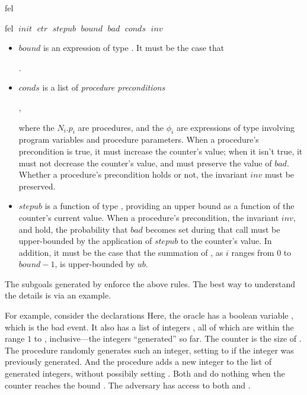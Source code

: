 \begin{tactic}{fel}
\begin{tsyntax}{fel $\;\mathit{init}$ $\;\mathit{ctr}$ $\;\mathit{stepub}$
                      $\;\mathit{bound}$ $\;\mathit{bad}$ $\;\mathit{conds}$
                      $\;\mathit{inv}$}
\begin{itemize}
    \item $\mathit{bound}$ is an expression of type . It must
      be the case that
      \begin{center}
        .
      \end{center}

    \item $\mathit{conds}$ is a list of \emph{procedure preconditions}
      \begin{center}
        ,
      \end{center}
      where the $N_i$.$p_i$ are procedures, and the $\phi_i$ are
      expressions of type  involving program variables and
      procedure parameters.  When a procedure's precondition is true,
      it must increase the counter's value; when it isn't true, it
      must not decrease the counter's value, and must preserve the
      value of $\mathit{bad}$. Whether a procedure's precondition
      holds or not, the invariant $\mathit{inv}$ must be preserved.

    \item $\mathit{stepub}$ is a function of type ,
      providing an upper bound as a function of the
      counter's current value. When a procedure's precondition, the
      invariant $\mathit{inv}$,  and  hold, the probability
      that $\mathit{bad}$ becomes set during that call must be
      upper-bounded by the application of $\mathit{stepub}$ to the
      counter's value.  In addition, it must be the case that the
      summation of , as $i$ ranges from
      $0$ to $\mathit{bound} - 1$, is upper-bounded by $\mathit{ub}$.

    \end{itemize}
    The subgoals generated by  enforce the above rules. The
    best way to understand the details is via an example.

    \medskip For example, consider the declarations
     Here, the oracle has
    a boolean variable , which is the bad event. It also has a
    list of integers , all of which are within the range $1$
    to , inclusive---the integers ``generated'' so far. The
    counter is the size of . The procedure  randomly
    generates such an integer, setting  to  if the
    integer was previously generated. And the procedure  adds
    a new integer to the list of generated integers, without possibily
    setting . Both  and  do nothing when the
    counter reaches the bound .  The adversary has access to both
     and .


\end{tsyntax}
\end{tactic}

